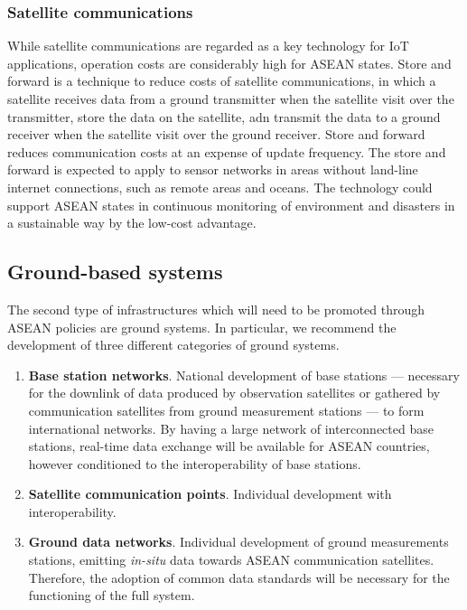 \subsubsection{Satellite communications}

While satellite communications are regarded as a key technology for IoT applications, operation costs are considerably high for ASEAN states. Store and forward is a technique to reduce costs of satellite communications, in which a satellite receives data from a ground transmitter when the satellite visit over the transmitter, store the data on the satellite, adn transmit the data to a ground receiver when the satellite visit over the ground receiver. Store and forward reduces communication costs at an expense of update frequency. The store and forward is expected to apply to sensor networks in areas without land-line internet connections, such as remote areas and oceans. The technology could support ASEAN states in continuous monitoring of environment and disasters in a sustainable way by the low-cost advantage.

\subsection{Ground-based systems}

\tab The second type of infrastructures which will need to be promoted through ASEAN policies are ground systems. In particular, we recommend the development of three different categories of ground systems.

\begin{enumerate}

\item \textbf{Base station networks}. National development of base stations --- necessary for the downlink of data produced by observation satellites or gathered by communication satellites from ground measurement stations --- to form international networks. By having a large network of interconnected base stations, real-time data exchange will be available for ASEAN countries, however conditioned to the interoperability of base stations.

\item \textbf{Satellite communication points}. Individual development with interoperability.

\item \textbf{Ground data networks}. Individual development of ground measurements stations, emitting \textit{in-situ} data towards ASEAN communication satellites. Therefore, the adoption of common data standards will be necessary for the functioning of the full system.

\end{enumerate}

